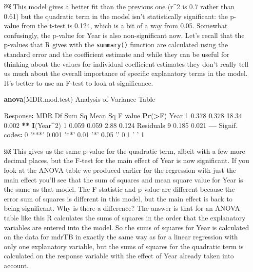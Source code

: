 \documentclass[
]{book}
\newenvironment{Shaded}{\begin{snugshade}}{\end{snugshade}}
\newcommand{\DecValTok}[1]{\textcolor[rgb]{0.00,0.00,0.81}{#1}}
\newcommand{\FloatTok}[1]{\textcolor[rgb]{0.00,0.00,0.81}{#1}}
\newcommand{\KeywordTok}[1]{\textcolor[rgb]{0.13,0.29,0.53}{\textbf{#1}}}
\newcommand{\NormalTok}[1]{#1}
\newcommand{\OperatorTok}[1]{\textcolor[rgb]{0.81,0.36,0.00}{\textbf{#1}}}
\newcommand{\StringTok}[1]{\textcolor[rgb]{0.31,0.60,0.02}{#1}}
\begin{document}
￼
This model gives a better fit than the previous one (r\^{}2 is 0.7 rather than 0.61) but the quadratic term in the model isn't statistically significant: the p-value from the t-test is 0.124, which is a bit of a way from 0.05. Somewhat confusingly, the p-value for Year is also non-significant now. Let's recall that the p-values that R gives with the \texttt{summary()} function are calculated using the standard error and the coefficient estimate and while they can be useful for thinking about the values for individual coefficient estimates they don't really tell us much about the overall importance of specific explanatory terms in the model. It's better to use an F-test to look at significance.

\begin{Shaded}
\begin{Highlighting}[]
\KeywordTok{anova}\NormalTok{(MDR.mod.test)}
\NormalTok{Analysis of Variance Table}

\NormalTok{Response}\OperatorTok{:}\StringTok{ }\NormalTok{MDR}
\NormalTok{          Df Sum Sq Mean Sq F value }\KeywordTok{Pr}\NormalTok{(}\OperatorTok{>}\NormalTok{F)   }
\NormalTok{Year       }\DecValTok{1}  \FloatTok{0.378}   \FloatTok{0.378}   \FloatTok{18.34}  \FloatTok{0.002} \OperatorTok{**}
\KeywordTok{I}\NormalTok{(Year}\OperatorTok{^}\DecValTok{2}\NormalTok{)  }\DecValTok{1}  \FloatTok{0.059}   \FloatTok{0.059}    \FloatTok{2.88}  \FloatTok{0.124}   
\NormalTok{Residuals  }\DecValTok{9}  \FloatTok{0.185}   \FloatTok{0.021}                  
\OperatorTok{---}
\NormalTok{Signif. codes}\OperatorTok{:}\StringTok{  }\DecValTok{0} \StringTok{'***'} \FloatTok{0.001} \StringTok{'**'} \FloatTok{0.01} \StringTok{'*'} \FloatTok{0.05} \StringTok{'.'} \FloatTok{0.1} \StringTok{' '} \DecValTok{1}
\end{Highlighting}
\end{Shaded}

￼
This gives us the same p-value for the quadratic term, albeit with a few more decimal places, but the F-test for the main effect of Year is now significant. If you look at the ANOVA table we produced earlier for the regression with just the main effect you'll see that the sum of squares and mean square value for Year is the same as that model. The F-statistic and p-value are different because the error sum of squares is different in this model, but the main effect is back to being significant. Why is there a difference? The answer is that for an ANOVA table like this R calculates the sums of squares in the order that the explanatory variables are entered into the model. So the sums of squares for Year is calculated on the data for mdrTB in exactly the same way as for a linear regression with only one explanatory variable, but the sums of squares for the quadratic term is calculated on the response variable with the effect of Year already taken into account.
\end{document}
